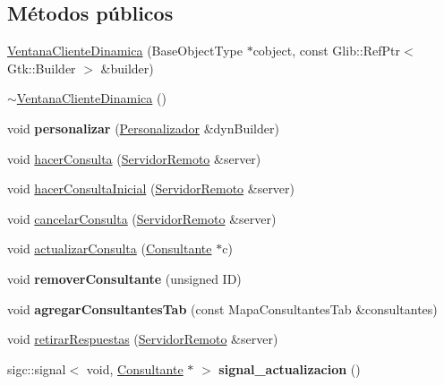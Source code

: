 \subsection*{\-Métodos públicos}
\begin{DoxyCompactItemize}
\item 
\hyperlink{classVentanaClienteDinamica_a361a32714dbd697a2a1da5d314629bb4}{\-Ventana\-Cliente\-Dinamica} (\-Base\-Object\-Type $\ast$cobject, const \-Glib\-::\-Ref\-Ptr$<$ \-Gtk\-::\-Builder $>$ \&builder)
\item 
\hyperlink{classVentanaClienteDinamica_a3e468899b8daf558ec88404bc0a20b3c}{$\sim$\-Ventana\-Cliente\-Dinamica} ()
\item 
\hypertarget{classVentanaClienteDinamica_ae1ba3d8addb021946b4dc00047089f17}{void {\bfseries personalizar} (\hyperlink{classPersonalizador}{\-Personalizador} \&dyn\-Builder)}\label{classVentanaClienteDinamica_ae1ba3d8addb021946b4dc00047089f17}

\item 
void \hyperlink{classVentanaClienteDinamica_a8b9c37b014ccf28503d1f0404cbf813b}{hacer\-Consulta} (\hyperlink{classServidorRemoto}{\-Servidor\-Remoto} \&server)
\item 
void \hyperlink{classVentanaClienteDinamica_a066dad76cbad2db6e4c4feea6be0aaec}{hacer\-Consulta\-Inicial} (\hyperlink{classServidorRemoto}{\-Servidor\-Remoto} \&server)
\item 
void \hyperlink{classVentanaClienteDinamica_a497609330575047e2b3c85084969af0b}{cancelar\-Consulta} (\hyperlink{classServidorRemoto}{\-Servidor\-Remoto} \&server)
\item 
void \hyperlink{classVentanaClienteDinamica_a7977c62c0d392af07095801165cacc8e}{actualizar\-Consulta} (\hyperlink{classConsultante}{\-Consultante} $\ast$c)
\item 
\hypertarget{classVentanaClienteDinamica_a1f24499e0658a5d7692cd8c504bee7bb}{void {\bfseries remover\-Consultante} (unsigned \-I\-D)}\label{classVentanaClienteDinamica_a1f24499e0658a5d7692cd8c504bee7bb}

\item 
\hypertarget{classVentanaClienteDinamica_a48de44dad399b8cfec7f273c6b7820d7}{void {\bfseries agregar\-Consultantes\-Tab} (const \-Mapa\-Consultantes\-Tab \&consultantes)}\label{classVentanaClienteDinamica_a48de44dad399b8cfec7f273c6b7820d7}

\item 
void \hyperlink{classVentanaClienteDinamica_ac065facdb5b764eb72b55cc57782382f}{retirar\-Respuestas} (\hyperlink{classServidorRemoto}{\-Servidor\-Remoto} \&server)
\item 
\hypertarget{classVentanaClienteDinamica_a035958088aa3d4fbf0ca2262016132a3}{sigc\-::signal$<$ void, \hyperlink{classConsultante}{\-Consultante} $\ast$ $>$ {\bfseries signal\-\_\-actualizacion} ()}\label{classVentanaClienteDinamica_a035958088aa3d4fbf0ca2262016132a3}

\end{DoxyCompactItemize}


